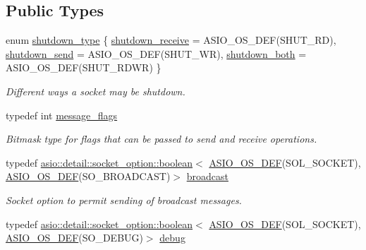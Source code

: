 \subsection*{Public Types}
\begin{DoxyCompactItemize}
\item 
enum \hyperlink{classasio_1_1socket__base_a915e52ff147efd296350bba81f795c37}{shutdown\+\_\+type} \{ \hyperlink{classasio_1_1socket__base_a915e52ff147efd296350bba81f795c37acbfe078d69142138f3162984ba6a1b9b}{shutdown\+\_\+receive} = A\+S\+I\+O\+\_\+\+O\+S\+\_\+\+D\+E\+F(S\+H\+U\+T\+\_\+\+R\+D), 
\hyperlink{classasio_1_1socket__base_a915e52ff147efd296350bba81f795c37a042d0121d26acaa45a86e0db3cb8aa62}{shutdown\+\_\+send} = A\+S\+I\+O\+\_\+\+O\+S\+\_\+\+D\+E\+F(S\+H\+U\+T\+\_\+\+W\+R), 
\hyperlink{classasio_1_1socket__base_a915e52ff147efd296350bba81f795c37a66b86f5f0b2524bc7652dc9c7c82c0fd}{shutdown\+\_\+both} = A\+S\+I\+O\+\_\+\+O\+S\+\_\+\+D\+E\+F(S\+H\+U\+T\+\_\+\+R\+D\+W\+R)
 \}\begin{DoxyCompactList}\small\item\em Different ways a socket may be shutdown. \end{DoxyCompactList}
\item 
typedef int \hyperlink{classasio_1_1socket__base_ac3cf77465dfedfe1979b5415cf32cc94}{message\+\_\+flags}
\begin{DoxyCompactList}\small\item\em Bitmask type for flags that can be passed to send and receive operations. \end{DoxyCompactList}\item 
typedef \hyperlink{classasio_1_1detail_1_1socket__option_1_1boolean}{asio\+::detail\+::socket\+\_\+option\+::boolean}$<$ \hyperlink{socket__types_8hpp_a26e0208fa086ac48cf5af1b2a521c74a}{A\+S\+I\+O\+\_\+\+O\+S\+\_\+\+D\+E\+F}(S\+O\+L\+\_\+\+S\+O\+C\+K\+E\+T), \hyperlink{socket__types_8hpp_a26e0208fa086ac48cf5af1b2a521c74a}{A\+S\+I\+O\+\_\+\+O\+S\+\_\+\+D\+E\+F}(S\+O\+\_\+\+B\+R\+O\+A\+D\+C\+A\+S\+T)$>$ \hyperlink{classasio_1_1socket__base_adb7828bb32a8912680906a66a6551ec3}{broadcast}
\begin{DoxyCompactList}\small\item\em Socket option to permit sending of broadcast messages. \end{DoxyCompactList}\item 
typedef \hyperlink{classasio_1_1detail_1_1socket__option_1_1boolean}{asio\+::detail\+::socket\+\_\+option\+::boolean}$<$ \hyperlink{socket__types_8hpp_a26e0208fa086ac48cf5af1b2a521c74a}{A\+S\+I\+O\+\_\+\+O\+S\+\_\+\+D\+E\+F}(S\+O\+L\+\_\+\+S\+O\+C\+K\+E\+T), \hyperlink{socket__types_8hpp_a26e0208fa086ac48cf5af1b2a521c74a}{A\+S\+I\+O\+\_\+\+O\+S\+\_\+\+D\+E\+F}(S\+O\+\_\+\+D\+E\+B\+U\+G)$>$ \hyperlink{classasio_1_1socket__base_a90b6054fb9139cda8b29a79d67ebe313}{debug}

\end{DoxyCompactItemize}

